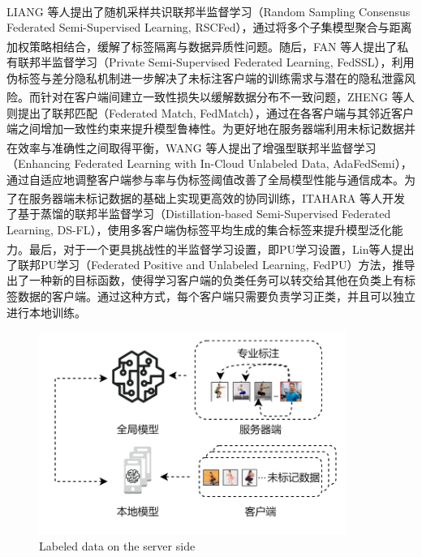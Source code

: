 LIANG\textsuperscript{\cite{liang2022rscfed}} 等人提出了随机采样共识联邦半监督学习（Random Sampling Consensus Federated Semi-Supervised Learning, RSCFed），通过将多个子集模型聚合与距离加权策略相结合，缓解了标签隔离与数据异质性问题。随后，FAN\textsuperscript{\cite{fan2022private}} 等人提出了私有联邦半监督学习（Private Semi-Supervised Federated Learning, FedSSL），利用伪标签与差分隐私机制进一步解决了未标注客户端的训练需求与潜在的隐私泄露风险。而针对在客户端间建立一致性损失以缓解数据分布不一致问题，ZHENG\textsuperscript{\cite{jeong2020federated}} 等人则提出了联邦匹配（Federated Match, FedMatch），通过在各客户端与其邻近客户端之间增加一致性约束来提升模型鲁棒性。为更好地在服务器端利用未标记数据并在效率与准确性之间取得平衡，WANG\textsuperscript{\cite{wang2022enhancing}} 等人提出了增强型联邦半监督学习（Enhancing Federated Learning with In-Cloud Unlabeled Data, AdaFedSemi），通过自适应地调整客户端参与率与伪标签阈值改善了全局模型性能与通信成本。为了在服务器端未标记数据的基础上实现更高效的协同训练，ITAHARA\textsuperscript{\cite{itahara2021distillation}} 等人开发了基于蒸馏的联邦半监督学习（Distillation-based Semi-Supervised Federated Learning, DS-FL），使用多客户端伪标签平均生成的集合标签来提升模型泛化能力。最后，对于一个更具挑战性的半监督学习设置，即PU学习设置，Lin\textsuperscript{\cite{FedPU}}等人提出了联邦PU学习（Federated Positive and Unlabeled Learning, FedPU）方法，推导出了一种新的目标函数，使得学习客户端的负类任务可以转交给其他在负类上有标签数据的客户端。通过这种方式，每个客户端只需要负责学习正类，并且可以独立进行本地训练。

\vspace{-0.1cm}
\begin{figure}[h]
	\centering
	\includegraphics[width=10cm]{chapters/imgs/LabelAtServer}
	{\wuhao Labeled data on the server side}
	\label{LabelAtServer}
\end{figure}
\vspace{-0.35cm}


